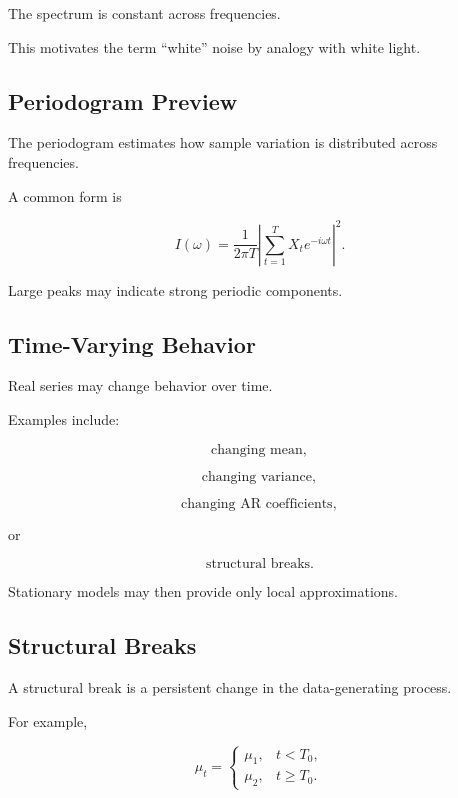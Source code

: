The spectrum is constant across frequencies.

This motivates the term ``white'' noise by analogy with white light.

\subsection{Periodogram Preview}
\label{subsec:periodogram-preview}

The periodogram estimates how sample variation is distributed across
frequencies.

A common form is

\[
\boxed{
I(\omega)
=
\frac1{2\pi T}
\left|
\sum_{t=1}^{T}
X_t
e^{-i\omega t}
\right|^2.
}
\]

Large peaks may indicate strong periodic components.

\subsection{Time-Varying Behavior}
\label{subsec:time-varying-behavior}

Real series may change behavior over time.

Examples include:

\[
\boxed{
\text{changing mean},
}
\]

\[
\boxed{
\text{changing variance},
}
\]

\[
\boxed{
\text{changing AR coefficients},
}
\]

or

\[
\boxed{
\text{structural breaks}.
}
\]

Stationary models may then provide only local approximations.

\subsection{Structural Breaks}
\label{subsec:structural-breaks}

A structural break is a persistent change in the data-generating process.

For example,

\[
\boxed{
\mu_t
=
\begin{cases}
\mu_1,&t<T_0,\\
\mu_2,&t\geq T_0.
\end{cases}
}
\]

